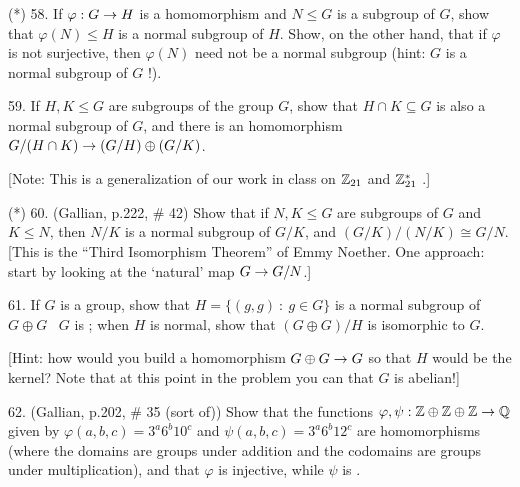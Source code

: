\documentclass[12pt]{article}
\begin{document}
\begin{description}

\item{(*) 58.} If $\varphi:G\rightarrow H$ is a  homomorphism and $N\leq G$
is a  subgroup of $G$, show that $\varphi(N)\leq H$ is a normal subgroup of $H$.
Show, on the other hand, that if $\varphi$ is not surjective, then $\varphi(N)$ 
need not be a normal subgroup (hint: $G$ is a normal subgroup of $G$ !).

\msk

\item{59.} If $H,K\leq G$ are  subgroups of the group $G$, show that 
$H\cap K\subseteq G$ is also a normal subgroup of $G$, and there is an 
homomorphism $G/(H\cap K)\rightarrow (G/H)\oplus(G/K)$.

\ssk

\item{\spc} [Note: This is a generalization of our work in class on ${\mathbb Z}_{21}$ and ${\mathbb Z}_{21}^*$ .]

\msk

\item{(*) 60.} (Gallian, p.222, \# 42) Show that if $N,K\leq G$ are 
subgroups of $G$ and $K\leq N$, then $N/K$ is a normal subgroup of 
$G/K$, and $(G/K)/(N/K) \cong G/N$. [This is the ``Third Isomorphism Theorem'' 
of Emmy Noether. One approach: start by looking at the `natural' map $G\rightarrow G/N$.]

\msk

\item{61.} If $G$ is a group, show that $H=\{(g,g)\ :\ g\in G\}$ is a normal 
subgroup of $G\oplus G$ \lra\ $G$ is ; when $H$ is normal, 
show that $(G\oplus G)/H$ is isomorphic to $G$.

\ssk

\item{\spc} [Hint: how would you build a homomorphism $G\oplus G\rightarrow G$ so that $H$ would be the kernel? Note
that at this point in the problem you can  that $G$ is abelian!]

\msk

\item{62.} (Gallian, p.202, \# 35 (sort of)) Show that the functions
$\varphi,\psi:{\mathbb Z}\oplus{\mathbb Z}\oplus{\mathbb Z}\rightarrow{\mathbb Q}$ given by $\varphi(a,b,c)=3^a6^b10^c$
and $\psi(a,b,c)=3^a6^b12^c$ are homomorphisms (where the domains are groups under 
addition and the codomains are groups under multiplication), and that 
$\varphi$ is injective, while $\psi$ is .


\end{description}
\end{document}
